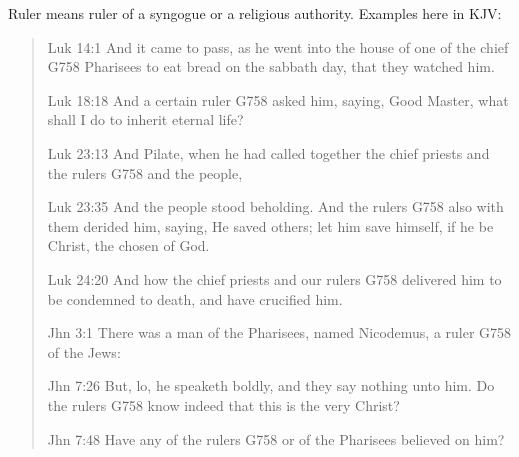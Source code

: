 \documentclass[11pt]{article}
\begin{document}
\begin{thebibliography}{37}
Ruler means ruler of a syngogue or a religious authority. Examples here in KJV:
\begin{quote}
 Luk 14:1
And it came to pass, as he went into the house of one of the chief G758 Pharisees to eat bread on the sabbath day, that they watched him.

 Luk 18:18
And a certain ruler G758 asked him, saying, Good Master, what shall I do to inherit eternal life?

 Luk 23:13
And Pilate, when he had called together the chief priests and the rulers G758 and the people,

 Luk 23:35
And the people stood beholding. And the rulers G758 also with them derided him, saying, He saved others; let him save himself, if he be Christ, the chosen of God.

 Luk 24:20
And how the chief priests and our rulers G758 delivered him to be condemned to death, and have crucified him.

 Jhn 3:1
There was a man of the Pharisees, named Nicodemus, a ruler G758 of the Jews:

 Jhn 7:26
But, lo, he speaketh boldly, and they say nothing unto him. Do the rulers G758 know indeed that this is the very Christ?

 Jhn 7:48
Have any of the rulers G758 or of the Pharisees believed on him?
\end{quote}


\end{thebibliography}
\end{document}
